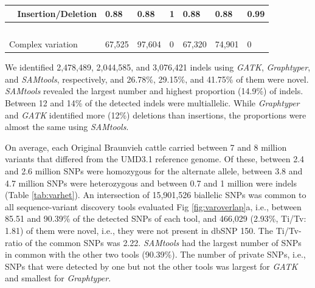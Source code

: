 \documentclass[../main.tex]{subfiles}
\begin{document}
\begin{landscape}
\begin{table}
\begin{tabular}{|l|l|l|l|l|l|l|}
        \hline
        ~ Insertion/Deletion                        & 0.88                                                                     & 0.88                                                                           & 1                                                                            & 0.88                                                                     & 0.88                                                                           & 0.99                                                                          \\ 
        \hline
        \multicolumn{7}{|l|}{~}  \\
        \hline
        Complex variation                           & 67,525                                                                   & 97,604                                                                         & 0                                                                            & 67,320                                                                   & 74,901                                                                         & 0                                                                             \\
        \hline
        \end{tabular}
        \label{tab:varcount}
    \end{table}
\end{landscape}

\newpage

We identified 2,478,489, 2,044,585, and 3,076,421 indels using \emph{GATK}, \emph{Graphtyper}, and \emph{SAMtools}, respectively, and 26.78\%, 29.15\%, and 41.75\% of them were novel. 
\emph{SAMtools} revealed the largest number and highest proportion (14.9\%) of indels. 
Between 12 and 14\% of the detected indels were multiallelic. 
While \emph{Graphtyper} and \emph{GATK} identified more (12\%) deletions than insertions, the proportions were almost the same using \emph{SAMtools}.

On average, each Original Braunvieh cattle carried between 7 and 8 million variants that differed from the UMD3.1 reference genome. 
Of these, between 2.4 and 2.6 million SNPs were homozygous for the alternate allele, between 3.8 and 4.7 million SNPs were heterozygous and between 0.7 and 1 million were indels (Table \ref{tab:varhet}). An intersection of 15,901,526 biallelic SNPs was common to all sequence-variant discovery tools evaluated Fig \ref{fig:varoverlap}a, i.e., between 85.51 and 90.39\% of the detected SNPs of each tool, and 466,029 (2.93\%, Ti/Tv: 1.81) of them were novel, i.e., they were not present in dbSNP 150. 
The Ti/Tv-ratio of the common SNPs was 2.22. 
\emph{SAMtools} had the largest number of SNPs in common with the other two tools (90.39\%). The number of private SNPs, i.e., SNPs that were detected by one but not the other tools was largest for \emph{GATK} and smallest for \emph{Graphtyper}.
\end{document}
